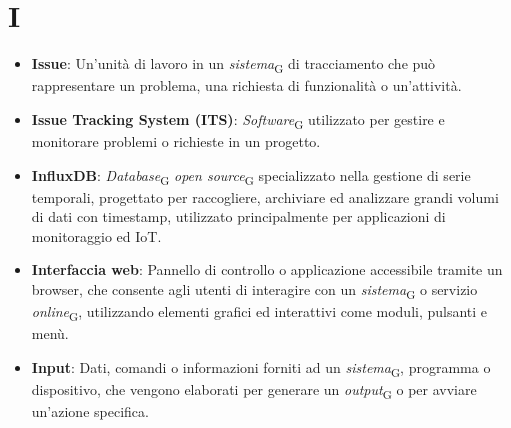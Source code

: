 \section{I}
\begin{itemize}
    \item \textbf{Issue}: Un'unità di lavoro in un \textit{sistema}\textsubscript{G} di tracciamento che può rappresentare un problema, una richiesta di funzionalità o un'attività.
    \item \textbf{Issue Tracking System (ITS)}: \textit{Software}\textsubscript{G} utilizzato per gestire e monitorare problemi o richieste in un progetto.
    \item \textbf{InfluxDB}: \textit{Database}\textsubscript{G} \textit{open source}\textsubscript{G} specializzato nella gestione di serie temporali, progettato per raccogliere, archiviare ed analizzare grandi volumi di dati con timestamp, utilizzato principalmente per applicazioni di monitoraggio ed IoT.
    \item \textbf{Interfaccia web}: Pannello di controllo o applicazione accessibile tramite un browser, che consente agli utenti di interagire con un \textit{sistema}\textsubscript{G} o servizio \textit{online}\textsubscript{G}, utilizzando elementi grafici ed interattivi come moduli, pulsanti e menù.
    \item \textbf{Input}: Dati, comandi o informazioni forniti ad un \textit{sistema}\textsubscript{G}, programma o dispositivo, che vengono elaborati per generare un \textit{output}\textsubscript{G} o per avviare un'azione specifica.
\end{itemize}
